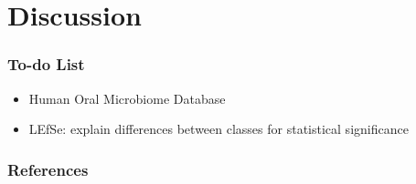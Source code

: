\documentclass{beamer}
\begin{document}
    \section{Discussion}
    \begin{frame}
        \frametitle{To-do List}

        \begin{itemize}
            \item Human Oral Microbiome Database
            \item LEfSe: explain differences between classes for statistical significance
        \end{itemize}
    \end{frame}

   	\begin{frame}[allowframebreaks]
        \frametitle{References}
        
        
    \end{frame}
\end{document}

